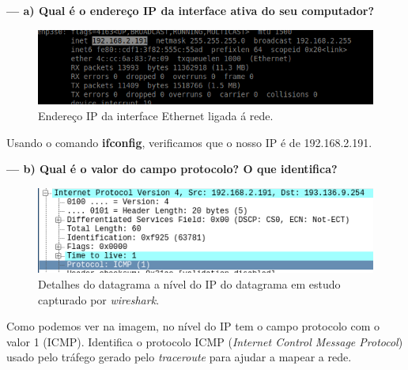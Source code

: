 \documentclass[a4paper]{article}
\begin{document}
\textbf{--- a) Qual é o endereço IP da interface ativa do	seu	computador?}\newline
\begin{figure}[!htb]
    \centering
    \includegraphics[scale=0.6]{pic7.png}\newline
    \caption{Endereço IP da interface Ethernet ligada á rede.}
    \label{fig:my_label}
\end{figure}
Usando o comando \textbf{ifconfig}, verificamos que o nosso IP é de 192.168.2.191.

\vspace{1cm}

\textbf{--- b) Qual é o valor do campo protocolo? O que identifica?}\newline
\begin{figure}[!htb]
    \centering
    \includegraphics[scale=0.7]{valor-protocolo.png}\newline
    \caption{Detalhes do datagrama a nível do IP do datagrama em estudo capturado por \textit{wireshark}.}
    \label{fig:my_label}
\end{figure}
Como podemos ver na imagem, no nível do IP tem o campo protocolo com o valor 1 (ICMP). Identifica o protocolo ICMP (\textit{Internet Control Message Protocol}) usado pelo tráfego gerado pelo \textit{traceroute} para ajudar a mapear a rede.

\newpage
\end{document}
